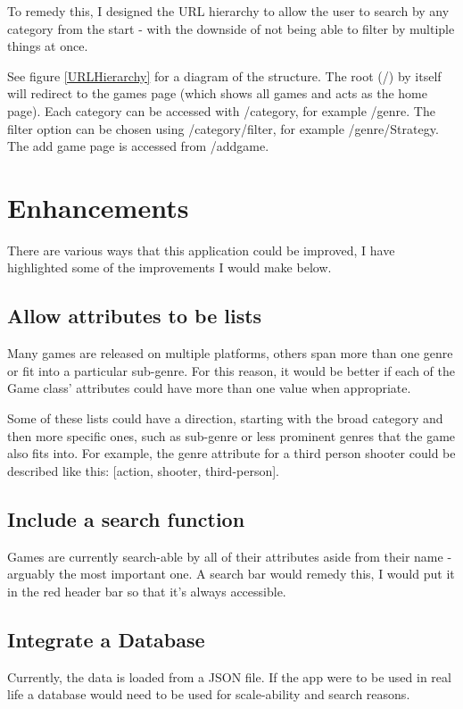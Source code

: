 \documentclass[10pt, a4paper]{article}
\begin{document}
	To remedy this, I designed the URL hierarchy to allow the user to search by any category from the start - with the downside of not being able to filter by multiple things at once.
	
	See figure \ref{URLHierarchy} for a diagram of the structure. The root (/) by itself will redirect to the games page (which shows all games and acts as the home page). Each category can be accessed with /category, for example /genre. The filter option can be chosen using /category/filter, for example /genre/Strategy. The add game page is accessed from /addgame.
	
	\section{Enhancements}
	There are various ways that this application could be improved, I have highlighted some of the improvements I would make below.
	
	\subsection{Allow attributes to be lists}
	Many games are released on multiple platforms, others span more than one genre or fit into a particular sub-genre. For this reason, it would be better if each of the Game class' attributes could have more than one value when appropriate. 
	
	Some of these lists could have a direction, starting with the broad category and then more specific ones, such as sub-genre or less prominent genres that the game also fits into. For example, the genre attribute for a third person shooter could be described like this: [action, shooter, third-person].
	
	\subsection{Include a search function}
	Games are currently search-able by all of their attributes aside from their name - arguably the most important one. A search bar would remedy this, I would put it in the red header bar so that it's always accessible.
	
	\subsection{Integrate a Database}
	Currently, the data is loaded from a JSON file. If the app were to be used in real life a database would need to be used for scale-ability and search reasons. 
	
\end{document}
